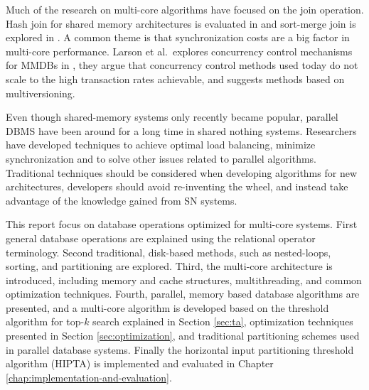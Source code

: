 Much of the research on multi-core algorithms  have focused on the
join operation. Hash join for shared memory architectures is evaluated
in \cite{hashjoin} and sort-merge join is explored in
\cite{sortmergejoin}. A common theme is that synchronization costs are
a big factor in multi-core performance. Larson et al.\ explores
concurrency control mechanisms for MMDBs in \cite{mmdb}, they argue
that concurrency control methods used today do not scale to the high
transaction rates achievable, and suggests methods based on
multiversioning.

Even though shared-memory systems only recently became popular,
parallel DBMS have been around for a long time in shared nothing
systems. Researchers have developed techniques to achieve optimal load
balancing, minimize synchronization and to solve other issues related
to parallel algorithms. Traditional techniques should be considered
when developing algorithms for new architectures, developers should
avoid re-inventing the wheel, and instead take advantage of the
knowledge gained from SN systems. 

This report focus on database operations optimized for multi-core
systems. First general database operations are explained using the
relational operator terminology. Second traditional, disk-based
methods, such as nested-loops, sorting, and partitioning are explored.
Third, the multi-core architecture is introduced, including memory and
cache structures, multithreading, and common optimization techniques.
Fourth, parallel, memory based database algorithms are presented, and
a multi-core algorithm is developed based on the threshold algorithm
for top-$k$ search explained in Section \ref{sec:ta}, optimization
techniques presented in Section \ref{sec:optimization}, and
traditional partitioning schemes used in parallel database
systems. Finally the horizontal input partitioning threshold
algorithm (HIPTA) is implemented and evaluated in Chapter
\ref{chap:implementation-and-evaluation}.
